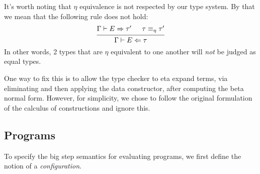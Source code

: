 \documentclass{article}
\begin{document}
It's worth noting that $\eta$ equivalence is not respected by our type system.
By that we mean that the following rule does not hold:
\[
  \begin{prooftree}
    \hypo{\Gamma \vdash E \Rightarrow \tau'}
    \hypo{\tau \equiv_{\eta} \tau'}
    \infer2{\Gamma \vdash E \Leftarrow \tau}
 \end{prooftree}
\]
In other words, 2 types that are $\eta$ equivalent to one another will 
\textit{not} be judged as equal types.

One way to fix this is to allow the type checker to eta expand terms, via
eliminating and then applying the data constructor, after computing the beta
normal form. However, for simplicity, we chose to follow the original 
formulation of the calculus of constructions and ignore this.





\subsection{Programs}
To specify the big step semantics for evaluating programs, we first define the
notion of a \textit{configuration}.
\begin{comment}
  Follows this approach:
  https://www.cs.cornell.edu/courses/cs6110/2013sp/lectures/lec05-sp13.pdf
\end{comment}
\end{document}

